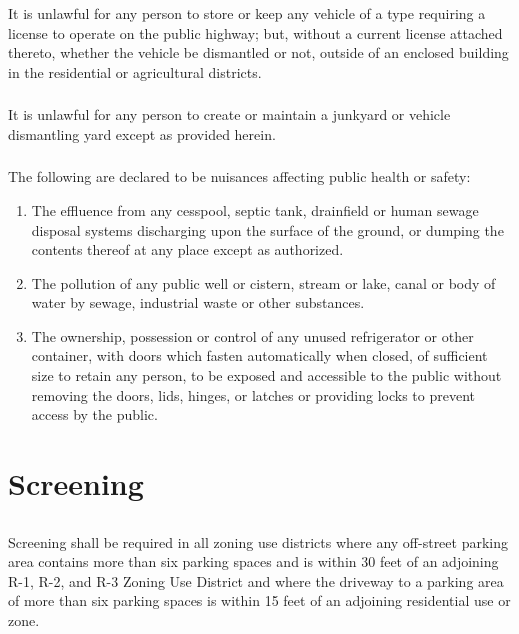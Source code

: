 \subsubsection{}
It is unlawful for any person to store or keep any vehicle of a type requiring a license to operate on the public highway; but, without a current license attached thereto, whether the vehicle be dismantled or not, outside of an enclosed building in the residential or agricultural districts.
\subsubsection{}
It is unlawful for any person to create or maintain a junkyard or vehicle dismantling yard except as provided herein.
\subsubsection{}
The following are declared to be nuisances affecting public health or safety:
\begin{enumerate}[{\indent}a)]
    \item The effluence from any cesspool, septic tank, drainfield or human sewage disposal systems discharging upon the surface of the ground, or dumping the contents thereof at any place except as authorized.
    \item The pollution of any public well or cistern, stream or lake, canal or body of water by sewage, industrial waste or other substances.
    \item The ownership, possession or control of any unused refrigerator or other container, with doors which fasten automatically when closed, of sufficient size to retain any person, to be exposed and accessible to the public without removing the doors, lids, hinges, or latches or providing locks to prevent access by the public.
\end{enumerate}

\section{Screening}
\subsection{}
Screening shall be required in all zoning use districts where any off-street parking area contains more than six parking spaces and is within 30 feet of an adjoining R-1, R-2, and R-3 Zoning Use District and where the driveway to a parking area of more than six parking spaces is within 15 feet of an adjoining residential use or zone.
